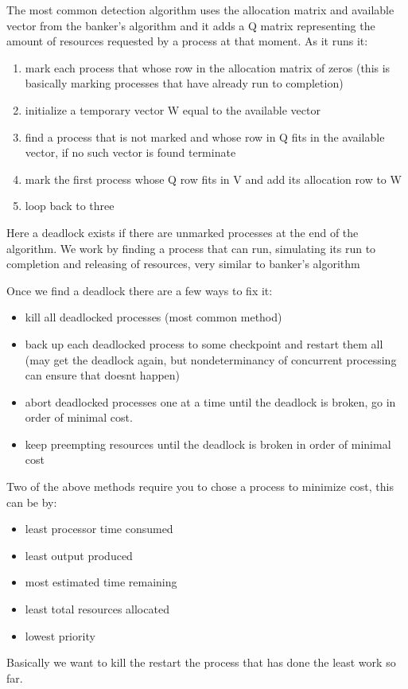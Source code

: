 \documentclass[12pt]{article}
\begin{document}
The most common detection algorithm uses the allocation matrix and available vector from the banker's algorithm and it adds a Q matrix representing the amount of resources requested by a process at that moment. As it runs it:
\begin{enumerate}
  \item mark each process that whose row in the allocation matrix of zeros (this is basically marking processes that have already run to completion)
  \item initialize a temporary vector W equal to the available vector
  \item find a process that is not marked and whose row in Q fits in the available vector, if no such vector is found terminate
  \item mark the first process whose Q row fits in V and add its allocation row to W
  \item loop back to three
\end{enumerate}
Here a deadlock exists if there are unmarked processes at the end of the algorithm. We work by finding a process that can run, simulating its run to completion and releasing of resources, very similar to banker's algorithm

Once we find a deadlock there are a few ways to fix it:
\begin{itemize}
  \item kill all deadlocked processes (most common method)
  \item back up each deadlocked process to some checkpoint and restart them all (may get the deadlock again, but nondeterminancy of concurrent processing can ensure that doesnt happen)
  \item abort deadlocked processes one at a time until the deadlock is broken, go in order of minimal cost.
  \item keep preempting resources until the deadlock is broken in order of minimal cost
\end{itemize}
Two of the above methods require you to chose a process to minimize cost, this can be by:
\begin{itemize}
  \item least processor time consumed
  \item least output produced
  \item most estimated time remaining
  \item least total resources allocated
  \item lowest priority
\end{itemize}
Basically we want to kill the restart the process that has done the least work so far.
\end{document}
